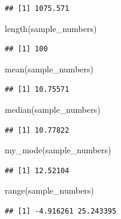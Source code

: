 \documentclass[
]{book}
\newenvironment{Shaded}{\begin{snugshade}}{\end{snugshade}}
\newcommand{\FunctionTok}[1]{\textcolor[rgb]{0.00,0.00,0.00}{#1}}
\newcommand{\NormalTok}[1]{#1}
\begin{document}
\begin{verbatim}
## [1] 1075.571
\end{verbatim}

\begin{Shaded}
\begin{Highlighting}[]
\FunctionTok{length}\NormalTok{(sample\_numbers)}
\end{Highlighting}
\end{Shaded}

\begin{verbatim}
## [1] 100
\end{verbatim}

\begin{Shaded}
\begin{Highlighting}[]
\FunctionTok{mean}\NormalTok{(sample\_numbers)}
\end{Highlighting}
\end{Shaded}

\begin{verbatim}
## [1] 10.75571
\end{verbatim}

\begin{Shaded}
\begin{Highlighting}[]
\FunctionTok{median}\NormalTok{(sample\_numbers)}
\end{Highlighting}
\end{Shaded}

\begin{verbatim}
## [1] 10.77822
\end{verbatim}

\begin{Shaded}
\begin{Highlighting}[]
\FunctionTok{my\_mode}\NormalTok{(sample\_numbers)}
\end{Highlighting}
\end{Shaded}

\begin{verbatim}
## [1] 12.52104
\end{verbatim}

\begin{Shaded}
\begin{Highlighting}[]
\FunctionTok{range}\NormalTok{(sample\_numbers)}
\end{Highlighting}
\end{Shaded}

\begin{verbatim}
## [1] -4.916261 25.243395
\end{verbatim}
\end{document}
